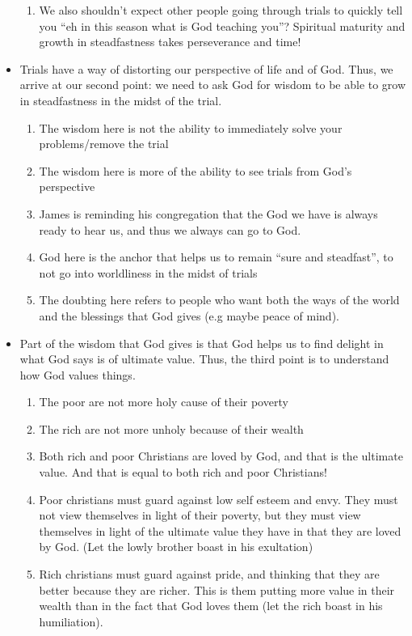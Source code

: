 \begin{itemize}
{\begin{enumerate}
    \item We also shouldn’t expect other people going through trials to quickly tell you “eh in this season what is God teaching you”? Spiritual maturity and growth in steadfastness takes perseverance and time!
  \end{enumerate}}
  \item{Trials have a way of distorting our perspective of life and of God. Thus, we arrive at our second point: we need to ask God for wisdom to be able to grow in steadfastness in the midst of the trial.
  \begin{enumerate}
    \item The wisdom here is not the ability to immediately solve your problems/remove the trial
    \item The wisdom here is more of the ability to see trials from God’s perspective
    \item James is reminding his congregation that the God we have is always ready to hear us, and thus we always can go to God.
    \item God here is the anchor that helps us to remain “sure and steadfast”, to not go into worldliness in the midst of trials
    \item The doubting here refers to people who want both the ways of the world and the blessings that God gives (e.g maybe peace of mind).
  \end{enumerate}}
  \item{Part of the wisdom that God gives is that God helps us to find delight in what God says is of ultimate value. Thus, the third point is to understand how God values things.
  \begin{enumerate}
    \item The poor are not more holy cause of their poverty
    \item The rich are not more unholy because of their wealth
    \item Both rich and poor Christians are loved by God, and that is the ultimate value. And that is equal to both rich and poor Christians!
    \item Poor christians must guard against low self esteem and envy. They must not view themselves in light of their poverty, but they must view themselves in light of the ultimate value they have in that they are loved by God. (Let the lowly brother boast in his exultation)
    \item Rich christians must guard against pride, and thinking that they are better because they are richer. This is them putting more value in their wealth than in the fact that God loves them (let the rich boast in his humiliation). 

\end{enumerate}}
\end{itemize}
